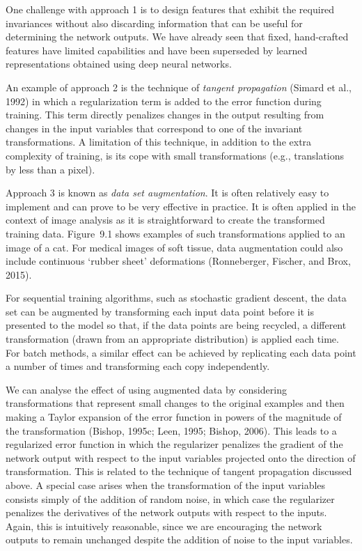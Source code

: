 \documentclass{article}
\begin{document}
One challenge with approach 1 is to design features that exhibit the required invariances without also discarding information that can be useful for determining the network outputs. We have already seen that fixed, hand-crafted features have limited capabilities and have been superseded by learned representations obtained using deep neural networks.

An example of approach 2 is the technique of \emph{tangent propagation} (Simard et al., 1992) in which a regularization term is added to the error function during training. This term directly penalizes changes in the output resulting from changes in the input variables that correspond to one of the invariant transformations. A limitation of this technique, in addition to the extra complexity of training, is its cope with small transformations (e.g., translations by less than a pixel).

Approach 3 is known as \emph{data set augmentation}. It is often relatively easy to implement and can prove to be very effective in practice. It is often applied in the context of image analysis as it is straightforward to create the transformed training data. Figure~9.1 shows examples of such transformations applied to an image of a cat. For medical images of soft tissue, data augmentation could also include continuous `rubber sheet' deformations (Ronneberger, Fischer, and Brox, 2015).

For sequential training algorithms, such as stochastic gradient descent, the data set can be augmented by transforming each input data point before it is presented to the model so that, if the data points are being recycled, a different transformation (drawn from an appropriate distribution) is applied each time. For batch methods, a similar effect can be achieved by replicating each data point a number of times and transforming each copy independently.

We can analyse the effect of using augmented data by considering transformations that represent small changes to the original examples and then making a Taylor expansion of the error function in powers of the magnitude of the transformation (Bishop, 1995c; Leen, 1995; Bishop, 2006). This leads to a regularized error function in which the regularizer penalizes the gradient of the network output with respect to the input variables projected onto the direction of transformation. This is related to the technique of tangent propagation discussed above. A special case arises when the transformation of the input variables consists simply of the addition of random noise, in which case the regularizer penalizes the derivatives of the network outputs with respect to the inputs. Again, this is intuitively reasonable, since we are encouraging the network outputs to remain unchanged despite the addition of noise to the input variables.
\end{document}

